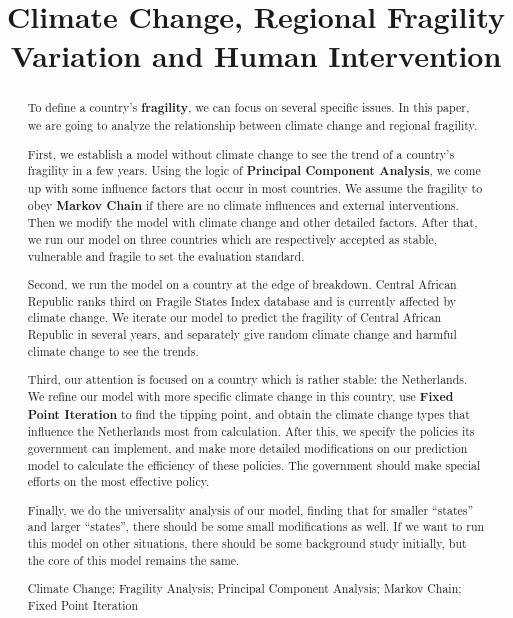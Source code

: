 \documentclass{mcmthesis}
\title{Climate Change, Regional Fragility Variation and Human Intervention}
\author{}
\date{}
\begin{document}
	\begin{abstract}
		To define a country's \textbf{fragility}, we can focus on several specific issues. In this paper, we are going to analyze the relationship between climate change and regional fragility.
		
		First, we establish a model without climate change to see the trend of a country's fragility in a few years. Using the logic of \textbf{Principal Component Analysis}, we come up with some influence factors that occur in most countries. We assume the fragility to obey \textbf{Markov Chain} if there are no climate influences and external interventions. Then we modify the model with climate change and other detailed factors. After that, we run our model on three countries which are respectively accepted as stable, vulnerable and fragile to set the evaluation standard.
		
		Second, we run the model on a country at the edge of breakdown. Central African Republic ranks third on Fragile States Index database and is currently affected by climate change. We iterate our model to predict the fragility of Central African Republic in several years, and separately give random climate change and harmful climate change to see the trends.
		
		Third, our attention is focused on a country which is rather stable: the Netherlands. We refine our model with more specific climate change in this country, use \textbf{Fixed Point Iteration} to find the tipping point, and obtain the climate change types that influence the Netherlands most from calculation. After this, we specify the policies its government can implement, and make more detailed modifications on our prediction model to calculate the efficiency of these policies. The government should make special efforts on the most effective policy.
		
		Finally, we do the universality analysis of our model, finding that for smaller “states” and larger “states”, there should be some small modifications as well. If we want to run this model on other situations, there should be some background study initially, but the core of this model remains the same.		
		
		\begin{keywords}
			Climate Change; Fragility Analysis; Principal Component Analysis; Markov Chain; Fixed Point Iteration
		\end{keywords}
	\end{abstract}
	\maketitle
	
\end{document}
